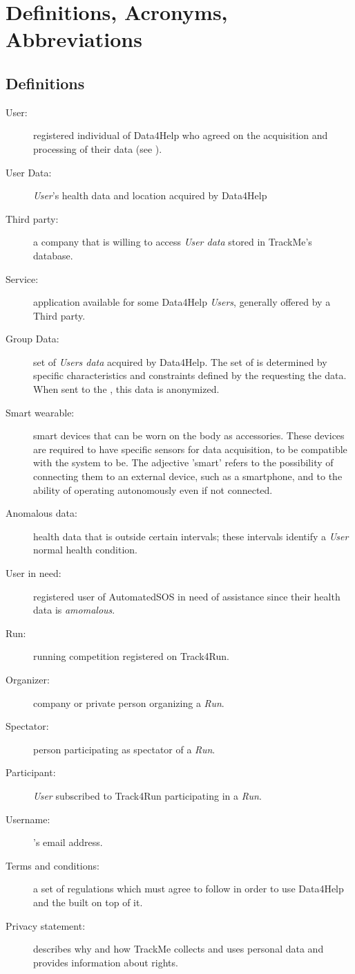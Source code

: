 \documentclass[../../rasd.tex]{subfiles}
\begin{document}
\section{Definitions, Acronyms, Abbreviations}
		\subsection{Definitions}
		\begin{description}
			\item[User:]registered individual of Data4Help who agreed on the acquisition and processing of their data (see ).
			\item[User Data:]\textit{User}'s health data and location acquired by Data4Help
			\item[Third party:]a company that is willing to access \textit{User data} stored in TrackMe's database.
			\item[Service:]application available for some Data4Help \textit{Users}, generally offered by a Third party.
			\item[Group Data:]set of \textit{Users data} acquired by Data4Help. The set of  is determined by specific characteristics and constraints defined by the  requesting the data. When sent to the , this data is anonymized.
			\item[Smart wearable:]smart devices that can be worn on the body as accessories. These devices are required to have specific sensors for data acquisition, to be compatible with the system to be. The adjective 'smart' refers to the possibility of connecting them to an external device, such as a smartphone, and to the ability of operating autonomously even if not connected.
			\item[Anomalous data:]health data that is outside certain intervals; these intervals identify a \textit{User} normal health condition.
			\item[User in need:]registered user of AutomatedSOS in need of assistance since their health data is \textit{amomalous}.
			\item[Run:]running competition registered on Track4Run. 
			\item[Organizer:]company or private person organizing a \textit{Run}.
			\item[Spectator:]person participating as spectator of a \textit{Run}.
			\item[Participant:]\textit{User} subscribed to Track4Run participating in a \textit{Run}.
			\item[Username:]'s email address.
			\item[Terms and conditions:]a set of regulations which  must agree to follow in order to use Data4Help and the  built on top of it.
			\item[Privacy statement:]describes why and how TrackMe collects and uses personal data and provides information about  rights.
			
			


		\end{description}
\end{document}
